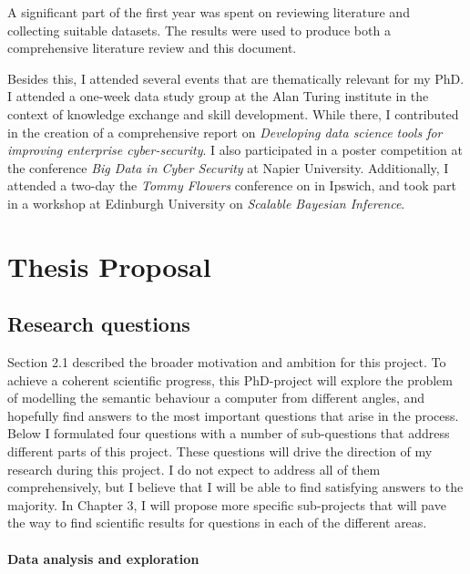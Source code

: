 \documentclass[a4paper,12pt,twoside]{report}
\begin{document}
A significant part of the first year was spent on reviewing literature and collecting suitable datasets. The results were used to produce both a comprehensive literature review and this document. 


Besides this, I attended several events that are thematically relevant for my PhD. I attended a one-week data study group at the Alan Turing institute in the context of knowledge exchange and skill development. While there, I contributed in the creation of a comprehensive report on \textit{Developing data science tools for improving enterprise cyber-security}. I also participated in a poster competition at the conference \textit{Big Data in Cyber Security} at Napier University. Additionally, I attended a two-day the \textit{Tommy Flowers} conference on  in Ipswich, and took part in a workshop at Edinburgh University on \textit{Scalable Bayesian Inference}.







\chapter{Thesis Proposal}\label{Obj}


\section{Research questions}\label{RQ}

Section 2.1 described the broader motivation and ambition for this project. To achieve a coherent scientific progress, this PhD-project will explore the problem of modelling the semantic behaviour a computer from different angles, and hopefully find answers to the most important questions that arise in the process. Below I formulated four questions with a number of sub-questions that address different parts of this project. These questions will drive the direction of my research during this project. I do not expect to address all of them comprehensively, but I believe that I will be able to find satisfying answers to the majority. In Chapter 3, I will propose more specific sub-projects that will pave the way to find scientific results for questions in each of the different areas.


\subsubsection{Data analysis and exploration}
\end{document}
